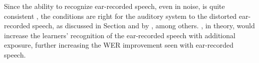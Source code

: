 





\DIFaddend Since the ability to recognize ear-recorded speech, even in noise, is quite consistent \DIFaddbegin {}\DIFaddend , the conditions are right for the auditory system to \DIFdelbegin {}\DIFdelend \DIFaddbegin {}\DIFaddend the distorted ear-recorded speech, as discussed in Section \DIFdelbegin \DIFdel{\ref{chap2:background} }\DIFdelend \DIFaddbegin \DIFadd{\ref{chap3:background} }\DIFaddend and by \cite{mattys:12}, among others.  \DIFdelbegin {}\DIFdelend \DIFaddbegin {}\DIFaddend , in theory, would increase the learners' recognition of the ear-recorded speech with additional exposure, further increasing the WER improvement seen with ear-recorded speech.


